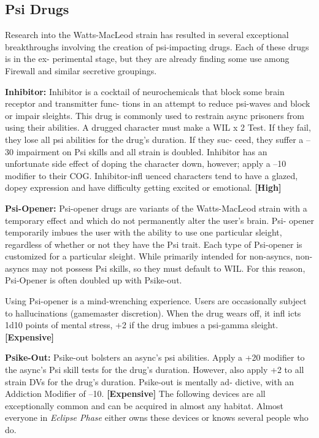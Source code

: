 \subsection{Psi Drugs}

Research into the Watts-MacLeod strain has resulted in 
several exceptional breakthroughs involving the creation 
of psi-impacting drugs. Each of these drugs is in the ex-
perimental stage, but they are already finding some use 
among Firewall and similar secretive groupings.

\textbf{Inhibitor:} Inhibitor is a cocktail of neurochemicals 
that block some brain receptor and transmitter func-
tions in an attempt to reduce psi-waves and block or 
impair sleights. This drug is commonly used to restrain 
async prisoners from using their abilities. A drugged 
character must make a WIL x 2 Test. If they fail, they 
lose all psi abilities for the drug's duration. If they suc-
ceed, they suffer a –30 impairment on Psi skills and 
all strain is doubled. Inhibitor has an unfortunate side 
effect of doping the character down, however; apply 
a –10 modifier to their COG. Inhibitor-infl uenced 
characters tend to have a glazed, dopey expression and 
have difficulty getting excited or emotional. \textbf{[High]}

\textbf{Psi-Opener:} Psi-opener drugs are variants of the 
Watts-MacLeod strain with a temporary effect and 
which do not permanently alter the user's brain. Psi-
opener temporarily imbues the user with the ability 
to use one particular sleight, regardless of whether or 
not they have the Psi trait. Each type of Psi-opener is 
customized for a particular sleight. While primarily 
intended for non-asyncs, non-asyncs may not possess 
Psi skills, so they must default to WIL. For this reason, 
Psi-Opener is often doubled up with Psike-out.

Using Psi-opener is a mind-wrenching experience. 
Users are occasionally subject to hallucinations 
(gamemaster discretion). When the drug wears off, it 
infl icts 1d10 points of mental stress, +2 if the drug 
imbues a psi-gamma sleight. \textbf{[Expensive]}

\textbf{Psike-Out:} Psike-out bolsters an async's psi abilities. 
Apply a +20 modifier to the async's Psi skill tests for the 
drug's duration. However, also apply +2 to all strain 
DVs for the drug's duration. Psike-out is mentally ad-
dictive, with an Addiction Modifier of –10. \textbf{[Expensive]}
The following devices are all exceptionally common 
and can be acquired in almost any habitat. Almost 
everyone in \textit{Eclipse Phase} either owns these devices or 
knows several people who do.

